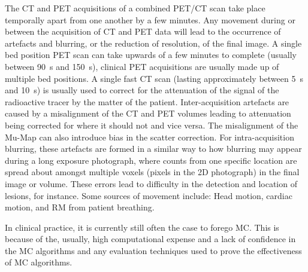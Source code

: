         The \gls{CT} and \gls{PET} acquisitions of a combined \gls{PET}/\gls{CT} scan take place temporally apart from one another by a few minutes. Any movement during or between the acquisition of \gls{CT} and \gls{PET} data will lead to the occurrence of artefacts and blurring, or the reduction of resolution, of the final image. A single bed position \gls{PET} scan can take upwards of a few minutes to complete (usually between \SI{90}{\second} and \SI{150}{\second}), clinical \gls{PET} acquisitions are usually made up of multiple bed positions. A single fast \gls{CT} scan (lasting approximately between \SI{5}{\second} and \SI{10}{\second}) is usually used to correct for the attenuation of the signal of the radioactive tracer by the matter of the patient. Inter-acquisition artefacts are caused by a misalignment of the \gls{CT} and \gls{PET} volumes leading to attenuation being corrected for where it should not and vice versa. The misalignment of the \gls{Mu-Map} can also introduce bias in the scatter correction. For intra-acquisition blurring, these artefacts are formed in a similar way to how blurring may appear during a long exposure photograph, where counts from one specific location are spread about amongst multiple voxels (pixels in the \gls{2D} photograph) in the final image or volume. These errors lead to difficulty in the detection and location of lesions, for instance. Some sources of movement include: Head motion, cardiac motion, and \gls{RM} from patient breathing.
    
        In clinical practice, it is currently still often the case to forego \gls{MC}. This is because of the, usually, high computational expense and a lack of confidence in the \gls{MC} algorithms and any evaluation techniques used to prove the effectiveness of \gls{MC} algorithms.%
    
